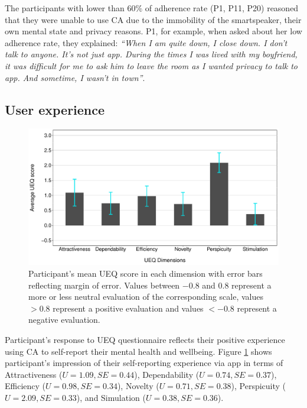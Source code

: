         The participants with lower than 60\% of adherence rate (P1, P11, P20) reasoned that they were unable to use \ac{CA} due to
            the immobility of the smartspeaker, 
            their own mental state and 
            privacy reasons. 
        P1, for example, when asked about her low adherence rate, they explained: 
        \textit{``When I am quite down, I close down. I don’t talk to anyone. It’s not just \acl{app}. During the times I was lived with my boyfriend, it was difficult for me to ask him to leave the room as I wanted privacy to talk to \acl{app}. And sometime, I wasn’t in town''}.


    \subsection{User experience}    
        \begin{figure}
            \centering
            \includegraphics[clip, trim=0cm 0cm 0.25cm 0.25cm, width=\textwidth]{figures/ueq.pdf}
            \caption{Participant's mean \ac{UEQ} score in each dimension with error bars reflecting margin of error.
            Values between $-0.8$ and $0.8$ represent a more or less neutral evaluation of the corresponding scale, values $> 0.8$ represent a positive evaluation and values $< -0.8$ represent a negative evaluation.}
            \label{fig:ueq}
        \end{figure}
        
        Participant's response to \ac{UEQ} questionnaire reflects their positive experience using \ac{CA} to self-report their mental health and wellbeing. 
        Figure \ref{fig:ueq} shows participant's impression of their self-reporting experience via \acl{app} in terms of
            Attractiveness ($U = 1.09, SE = 0.44 $),
            Dependability ($U = 0.74, SE = 0.37 $),
            Efficiency ($U = 0.98, SE = 0.34 $),
            Novelty ($U = 0.71, SE = 0.38 $),
            Perspicuity ($U = 2.09, SE = 0.33 $), and
            Simulation ($U = 0.38, SE = 0.36 $).
                
